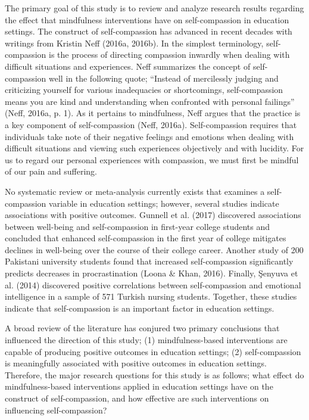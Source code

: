 \documentclass[10pt]{article}
\begin{document}
The primary goal of this study is to review and analyze research results
regarding the effect that mindfulness interventions have on
self-compassion in education settings. The construct of self-compassion
has advanced in recent decades with writings from Kristin Neff (2016a,
2016b). In the simplest terminology, self-compassion is the process of
directing compassion inwardly when dealing with difficult situations and
experiences. Neff summarizes the concept of self-compassion well in the
following quote; ``Instead of mercilessly judging and criticizing
yourself for various inadequacies or shortcomings, self-compassion means
you are kind and understanding when confronted with personal failings''
(Neff, 2016a, p. 1). As it pertains to mindfulness, Neff argues that the
practice is a key component of self-compassion (Neff, 2016a).
Self-compassion requires that individuals take note of their negative
feelings and emotions when dealing with difficult situations and viewing
such experiences objectively and with lucidity. For us to regard our
personal experiences with compassion, we must first be mindful of our
pain and suffering.

No systematic review or meta-analysis currently exists that examines a
self-compassion variable in education settings; however, several studies
indicate associations with positive outcomes. Gunnell et al. (2017)
discovered associations between well-being and self-compassion in
first-year college students and concluded that enhanced self-compassion
in the first year of college mitigates declines in well-being over the
course of their college career. Another study of 200 Pakistani
university students found that increased self-compassion significantly
predicts decreases in procrastination (Loona \& Khan, 2016). Finally,
Şenyuva et al. (2014) discovered positive correlations between self-compassion and emotional intelligence in a sample of 571 Turkish
nursing students. Together, these studies indicate that self-compassion
is an important factor in education settings.

A broad review of the literature has conjured two primary conclusions
that influenced the direction of this study; (1) mindfulness-based
interventions are capable of producing positive outcomes in education
settings; (2) self-compassion is meaningfully associated with positive
outcomes in education settings. Therefore, the major research questions
for this study is as follows; what effect do mindfulness-based
interventions applied in education settings have on the construct of
self-compassion, and how effective are such interventions on influencing
self-compassion?
\end{document}
